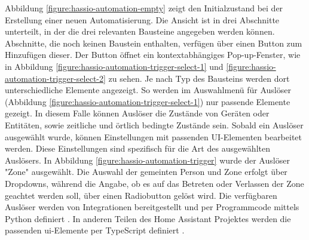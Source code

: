 Abbildung \ref{figure:hassio-automation-empty} zeigt den Initialzustand bei der Erstellung einer
neuen Automatisierung. Die Ansicht ist in drei Abschnitte unterteilt, in der die drei relevanten
Bausteine angegeben werden können. Abschnitte, die noch keinen Baustein enthalten, verfügen über
einen Button zum Hinzufügen dieser. Der Button öffnet ein kontextabhängiges Pop-up-Fenster, wie in
Abbildung \ref{figure:hassio-automation-trigger-select-1} und
\ref{figure:hassio-automation-trigger-select-2} zu sehen. Je nach Typ des Bausteins werden dort
unterschiedliche Elemente angezeigt. So werden im Auswahlmenü für Auslöser (Abbildung
\ref{figure:hassio-automation-trigger-select-1}) nur passende Elemente gezeigt. In diesem Falle
können Auslöser die Zustände von Geräten oder Entitäten, sowie zeitliche und örtlich bedingte
Zustände sein. Sobald ein Auslöser ausgewählt wurde, können Einstellungen mit passenden UI-Elementen
bearbeitet werden. Diese Einstellungen sind spezifisch für die Art des ausgewählten Auslösers. In
Abbildung \ref{figure:hassio-automation-trigger} wurde der Auslöser "Zone" ausgewählt. Die Auswahl
der gemeinten Person und Zone erfolgt über Dropdowns, während die Angabe, ob es auf das Betreten
oder Verlassen der Zone geachtet werden soll, über einen Radiobutton gelöst wird.  Die verfügbaren Auslöser werden von Integrationen bereitgestellt
und per Programmcode mittels Python definiert \parencite{homeassistantDeviceAutomations2023}. In
anderen Teilen des Home Assistant Projektes werden die passenden \ac{ui}-Elemente per TypeScript
definiert \parencite{homeassistantHomeassistantFrontend}.

